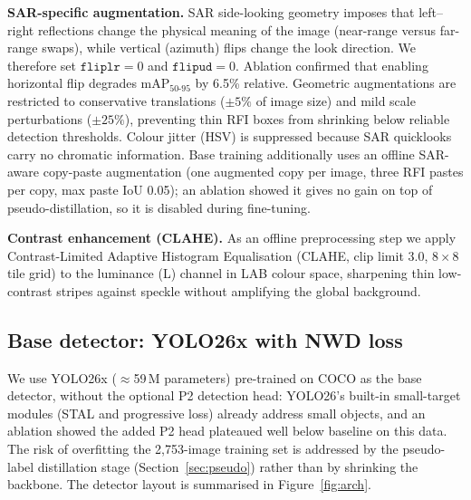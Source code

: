 \documentclass{article}
\begin{document}
\textbf{SAR-specific augmentation.} SAR side-looking geometry imposes
that left--right reflections change the physical meaning of the image
(near-range versus far-range swaps), while vertical (azimuth) flips
change the look direction. We therefore set $\texttt{fliplr}=0$ and
$\texttt{flipud}=0$. Ablation confirmed that enabling horizontal flip
degrades mAP$_{50\text{-}95}$ by 6.5\% relative. Geometric
augmentations are restricted to conservative translations ($\pm5\%$ of
image size) and mild scale perturbations ($\pm25\%$), preventing thin
RFI boxes from shrinking below reliable detection thresholds. Colour
jitter (HSV) is suppressed because SAR quicklooks carry no chromatic
information. Base training additionally uses an offline SAR-aware
copy-paste augmentation (one augmented copy per image, three RFI
pastes per copy, max paste IoU 0.05); an ablation showed it gives no
gain on top of pseudo-distillation, so it is disabled during
fine-tuning.

\textbf{Contrast enhancement (CLAHE).} As an offline preprocessing
step we apply Contrast-Limited Adaptive Histogram Equalisation
(CLAHE, clip limit 3.0, $8\times8$ tile grid) to the luminance (L)
channel in LAB colour space, sharpening thin low-contrast stripes
against speckle without amplifying the global background.

\subsection{Base detector: YOLO26x with NWD loss}
\label{sec:base}

We use YOLO26x \cite{ultralytics2024yolo11} ($\approx$59\,M
parameters) pre-trained on COCO as the base detector, without the
optional P2 detection head: YOLO26's built-in small-target modules
(STAL and progressive loss) already address small objects, and an
ablation showed the added P2 head plateaued well below baseline on
this data. The risk of overfitting the 2{,}753-image training set is
addressed by the pseudo-label distillation stage
(Section~\ref{sec:pseudo}) rather than by shrinking the backbone. The
detector layout is summarised in Figure~\ref{fig:arch}.
\end{document}
